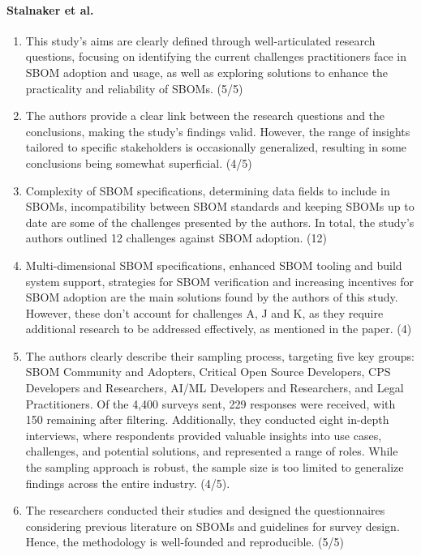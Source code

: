\paragraph{Stalnaker et al. \cite{article:software-bom}}

\begin{enumerate}
    \item This study's aims are clearly defined through well-articulated research questions, focusing on identifying the current challenges practitioners face in SBOM adoption and usage, as well as exploring solutions to enhance the practicality and reliability of SBOMs. (5/5)
    \item The authors provide a clear link between the research questions and the conclusions, making the study's findings valid. However, the range of insights tailored to specific stakeholders is occasionally generalized, resulting in some conclusions being somewhat superficial. (4/5)
    \item Complexity of SBOM specifications, determining data fields to include in SBOMs, incompatibility between SBOM standards and keeping SBOMs up to date are some of the challenges presented by the authors. In total, the study's authors outlined 12 challenges against SBOM adoption. (12)
    \item Multi-dimensional SBOM specifications, enhanced SBOM tooling and build system support, strategies for SBOM verification and increasing incentives for SBOM adoption are the main solutions found by the authors of this study. However, these don't account for challenges A, J and K, as they require additional research to be addressed effectively, as mentioned in the paper. (4)
    \item The authors clearly describe their sampling process, targeting five key groups: SBOM Community and Adopters, Critical Open Source Developers, CPS Developers and Researchers, AI/ML Developers and Researchers, and Legal Practitioners. Of the 4,400 surveys sent, 229 responses were received, with 150 remaining after filtering. Additionally, they conducted eight in-depth interviews, where respondents provided valuable insights into use cases, challenges, and potential solutions, and represented a range of roles. While the sampling approach is robust, the sample size is too limited to generalize findings across the entire industry. (4/5).
    \item The researchers conducted their studies and designed the questionnaires considering previous literature on SBOMs and guidelines for survey design. Hence, the methodology is well-founded and reproducible. (5/5)
\end{enumerate}

